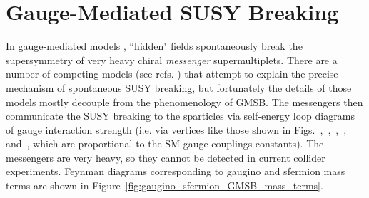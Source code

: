 \documentclass[dissertation.tex]{subfiles}
\begin{document}
\section{Gauge-Mediated SUSY Breaking}
\label{sec:Gauge-Mediated SUSY Breaking}

In gauge-mediated models \cite{Dine1982227,Nappi1982175,AlvarezGaume198296,PhysRevD.48.1277,PhysRevD.51.1362,PhysRevD.53.2658}, ``hidden" fields spontaneously break the supersymmetry of very heavy chiral \textit{messenger} supermultiplets.  There are a number of competing models (see refs. \cite{Dine1982227,Nappi1982175,AlvarezGaume198296,PhysRevD.48.1277,PhysRevD.51.1362,PhysRevD.53.2658}) that attempt to explain the precise mechanism of spontaneous SUSY breaking, but fortunately the details of those models mostly decouple from the phenomenology of GMSB.  The messengers then communicate the SUSY breaking to the sparticles via self-energy loop diagrams of gauge interaction strength (i.e. via vertices like those shown in Figs.~,~,~,~, and~, which are proportional to the SM gauge couplings constants).  The messengers are very heavy, so they cannot be detected in current collider experiments.  Feynman diagrams corresponding to gaugino and sfermion mass terms are shown in Figure~\ref{fig:gaugino_sfermion_GMSB_mass_terms}.
\end{document}
